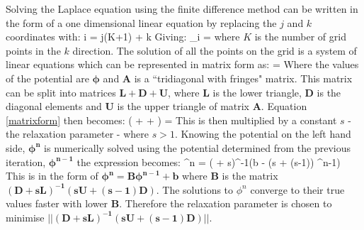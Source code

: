 Solving the Laplace equation using the finite difference method can be written in the form of a one dimensional linear equation by replacing the $j$ and $k$ coordinates with:
\be
i = j(K+1) + k
\ee
Giving:
\be
\phi_{i} = 
\ee
where $K$ is the number of grid points in the $k$ direction. The solution of all the points on the grid is a system of linear equations which can be represented in matrix form as:
\be
\label{matrixform}
 \cdot \boldsymbol{\phi} = 
\ee
Where the values of the potential are $\boldsymbol{\phi}$ and $\boldsymbol{A}$ is a ``tridiagonal with fringes" matrix. This matrix can be split into matrices $\boldsymbol{L + D + U}$, where $\boldsymbol{L}$ is the lower triangle, $\boldsymbol{D}$ is the diagonal elements  and $\boldsymbol{U}$ is the upper triangle of matrix $\boldsymbol{A}$. Equation \ref{matrixform} then becomes:
\be
( +  + ) \cdot \boldsymbol{\phi} = 
\ee
This is then multiplied by a constant $s$ - the relaxation parameter - where $s > 1$. Knowing  the potential on the left hand side, $\boldsymbol{\phi^{n}}$ is numerically solved using the potential determined from the previous iteration, $\boldsymbol{\phi^{n-1}}$ the expression becomes:
\be
\boldsymbol{\phi}^{n} = ( + s)^{-1}(b - (s + (s-1)) \cdot \boldsymbol{\phi}^{n-1})
\ee
This is in the form of $\boldsymbol{\phi^{n} = B\phi^{n-1} + b}$ where $\boldsymbol{B}$ is the matrix $\boldsymbol{(D + sL)^{-1}(sU + (s-1)D)}$. The solutions to $\phi^{n}$ converge to their true values faster with lower $\boldsymbol{B}$. Therefore the relaxation parameter is chosen to minimise $\boldsymbol{||(D + sL)^{-1}(sU + (s-1)D)}||$.
